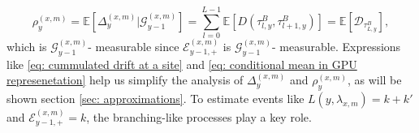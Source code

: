 \documentclass[twoside,12pt,a4paper]{article}
\numberwithin{equation}{section}
\begin{document}
		\begin{equation}\label{eq: conditional mean in GPU represenetation}
			\rho_{y}^{(x,m)} = \mathbb{E}\left[\Delta_{y}^{(x,m)} \vert \mathcal{G}_{y-1}^{(x,m)}\right] = \sum_{l=0 }^{ L -1  } \mathbb{E}\left[ D(\tau^{B}_{l,y},\tau^{B}_{l+1,y} ) \right] = \mathbb{E}\left[ \mathcal{D}_{\tau^{B}_{L,y}} \right],
		\end{equation} which is $\mathcal{G}_{y-1}^{(x,m)}$- measurable since $\mathcal{E}^{(x,m)}_{y-1,+} $ is $\mathcal{G}_{y-1}^{(x,m)}$- measurable. 
		Expressions like \eqref{eq: cummulated drift at a site} and \eqref{eq: conditional mean in GPU represenetation} help us simplify the analysis of $\Delta_{y}^{(x,m)}$ and $\rho_{y}^{(x,m)}$, as will be shown section \ref{sec: approximations}. To estimate events like $ L(y,\lambda_{x,m}) = k+k'$ and $\mathcal{E}^{(x,m)}_{y-1,+} = k $, the branching-like processes play a key role. 
		
		
\end{document}
